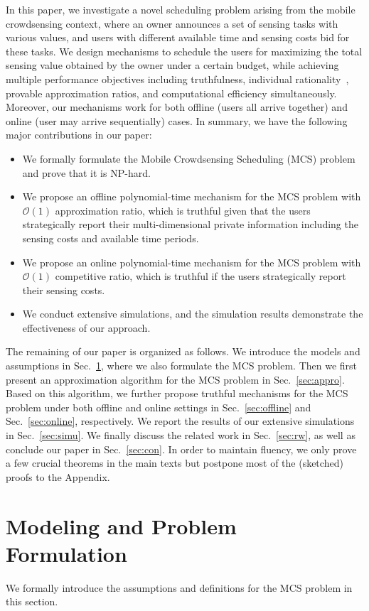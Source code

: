 \documentclass[10pt,journal,compsoc]{IEEEtran}
\begin{document}
  In this paper, we investigate a novel scheduling problem arising from the mobile crowdsensing context, where an owner announces a set of sensing tasks with various values, and users with different available time and sensing costs bid for these tasks. We design mechanisms to schedule the users for maximizing the total sensing value obtained by the owner under a certain budget, while achieving multiple performance objectives including truthfulness, individual rationality~\cite{Nisan2007}, provable approximation ratios, and computational efficiency simultaneously. Moreover, our mechanisms work for both offline (users all arrive together) and online (user may arrive sequentially) cases. In summary, we have the following major contributions in our paper:
\begin{itemize}
\item We formally formulate the Mobile Crowdsensing Scheduling (MCS) problem and prove that it is NP-hard.
\item We propose an offline polynomial-time mechanism for the MCS problem with $\mathcal{O}(1)$ approximation ratio, which is truthful given that the users strategically report their multi-dimensional private information including the sensing costs and available time periods.
\item We propose an online polynomial-time mechanism for the MCS problem with $\mathcal{O}(1)$ competitive ratio, which is truthful if the users strategically report their sensing costs.
\item We conduct extensive simulations, and the simulation results demonstrate the effectiveness of our approach.
\end{itemize}

  The remaining of our paper is organized as follows. We introduce the models and assumptions in Sec.~\ref{sec:model}, where we also formulate the MCS problem. Then we first present an approximation algorithm for the MCS problem in Sec.~\ref{sec:appro}. Based on this algorithm, we further propose truthful mechanisms for the MCS problem under both offline and online settings in Sec.~\ref{sec:offline} and Sec.~\ref{sec:online}, respectively. We report the results of our extensive simulations in Sec.~\ref{sec:simu}. We finally discuss the related work in Sec.~\ref{sec:rw}, as well as conclude our paper in Sec.~\ref{sec:con}. In order to maintain fluency, we only prove a few crucial theorems in the main texts but postpone most of the (sketched) proofs to the Appendix.


\section{Modeling and Problem Formulation} \label{sec:model}
We formally introduce the assumptions and definitions for the MCS problem in this section.
\end{document}
